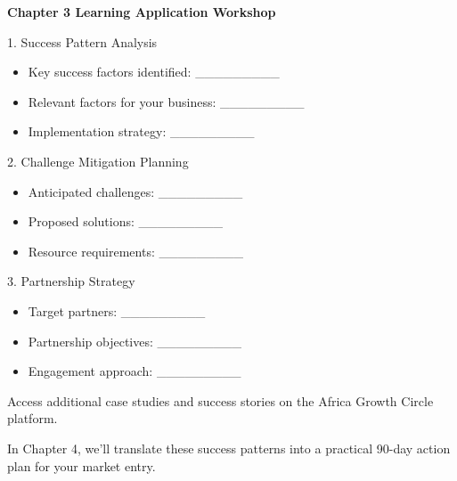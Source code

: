 \begin{workshopbox}
\textbf{Chapter 3 Learning Application Workshop}

1. Success Pattern Analysis
\begin{itemize}
    \item Key success factors identified: \_\_\_\_\_\_\_\_\_
    \item Relevant factors for your business: \_\_\_\_\_\_\_\_\_
    \item Implementation strategy: \_\_\_\_\_\_\_\_\_
\end{itemize}

2. Challenge Mitigation Planning
\begin{itemize}
    \item Anticipated challenges: \_\_\_\_\_\_\_\_\_
    \item Proposed solutions: \_\_\_\_\_\_\_\_\_
    \item Resource requirements: \_\_\_\_\_\_\_\_\_
\end{itemize}

3. Partnership Strategy
\begin{itemize}
    \item Target partners: \_\_\_\_\_\_\_\_\_
    \item Partnership objectives: \_\_\_\_\_\_\_\_\_
    \item Engagement approach: \_\_\_\_\_\_\_\_\_
\end{itemize}

Access additional case studies and success stories on the Africa Growth Circle platform.
\end{workshopbox}

\begin{importantbox}
In Chapter 4, we'll translate these success patterns into a practical 90-day action plan for your market entry.
\end{importantbox}